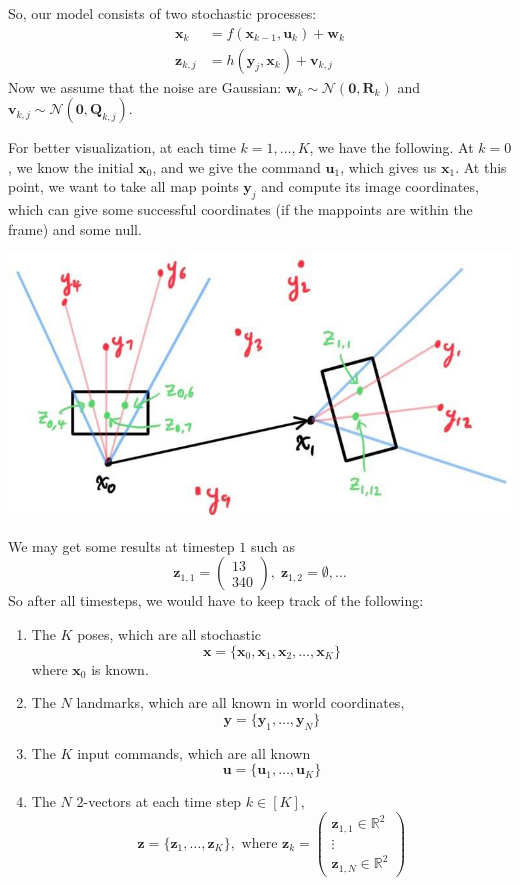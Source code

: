 \documentclass{article}
\theoremstyle{definition}
\theoremstyle{remark}
\theoremstyle{definition}
\begin{document}
So, our model consists of two stochastic processes: 
\begin{align*}
    \mathbf{x}_{k} & = f(\mathbf{x}_{k-1}, \mathbf{u}_k) + \mathbf{w}_k \\
    \mathbf{z}_{k, j} & = h (\mathbf{y}_j , \mathbf{x}_k) + \mathbf{v}_{k, j}
\end{align*}
Now we assume that the noise are Gaussian: $\mathbf{w}_k \sim \mathcal{N}(\mathbf{0}, \mathbf{R}_k)$ and $\mathbf{v}_{k, j} \sim \mathcal{N}(\mathbf{0}, \mathbf{Q}_{k, j})$. 

For better visualization, at each time $k = 1, \ldots, K$, we have the following. At $k = 0$, we know the initial $\mathbf{x}_0$, and we give the command $\mathbf{u}_1$, which gives us $\mathbf{x}_1$. At this point, we want to take all map points $\mathbf{y}_j$ and compute its image coordinates, which can give some successful coordinates (if the mappoints are within the frame) and some null. 
\begin{center}
    \includegraphics[scale=0.4]{img/time_1.jpg}
\end{center}
We may get some results at timestep $1$ such as 
\[\mathbf{z}_{1, 1} = \begin{pmatrix} 13 \\ 340 \end{pmatrix} , \; \mathbf{z}_{1, 2} = \emptyset, \ldots \]
So after all timesteps, we would have to keep track of the following: 
\begin{enumerate}
    \item The $K$ poses, which are all stochastic
    \[\mathbf{x} = \{\mathbf{x}_0, \mathbf{x}_1, \mathbf{x}_2, \ldots, \mathbf{x}_K\}\]
    where $\mathbf{x}_0$ is known. 
    \item The $N$ landmarks, which are all known in world coordinates, 
    \[\mathbf{y} = \{ \mathbf{y}_1, \ldots, \mathbf{y}_N\}\]
    
    \item The $K$ input commands, which are all known
    \[\mathbf{u} = \{\mathbf{u}_1, \ldots, \mathbf{u}_K\}\]
    
    \item The $N$ $2$-vectors at each time step $k \in [K]$, 
    \[\mathbf{z} = \{\mathbf{z}_1, \ldots, \mathbf{z}_K\}, \text{ where } \mathbf{z}_k = \begin{pmatrix} \mathbf{z}_{1, 1} \in \mathbb{R}^2 \\ \vdots \\ \mathbf{z}_{1, N} \in \mathbb{R}^2 \end{pmatrix} \]
\end{enumerate}
\end{document}
